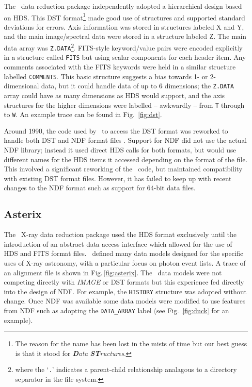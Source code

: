 \documentclass[final,authoryear,5p,times,twocolumn]{elsarticle}
\begin{document}
The \figaro\ data reduction package
\citep[][]{1988igbo.conf..448C,1993ASPC...52..219S}
independently adopted a hierarchical design based on HDS. This DST
format\footnote{The reason for the name has been lost in the mists of
  time but our best guess is that it stood for \emph{\textbf{D}ata
    \textbf{ST}ructures}.} made good use of structures and supported
standard deviations for errors. Axis information was stored in
structures labeled X and Y, and the main image/spectral data were
stored in a structure labeled Z. The main data array was
\texttt{Z.DATA}\footnote{where the `\texttt{.}' indicates a
  parent-child relationship analagous to a directory separator in the
  file system.}. FITS-style keyword/value pairs were encoded
explicitly in a structure called \texttt{FITS} but using scalar
components for each header item. Any comments associated with the FITS
keywords were held in a similar structure labelled
\texttt{COMMENTS}. This basic structure suggests a bias towards 1- or
2-dimensional data, but it could handle data of up to 6 dimensions;
the \texttt{Z.DATA} array could have as many dimensions as HDS would
support, and the axis structures for the higher dimensions were
labelled -- awkwardly -- from \texttt{T} through to \texttt{W}. An
example trace can be found in Fig.~\ref{fig:dst}.

Around 1990, the code used by \figaro\ to access the DST format was
reworked to handle both DST and NDF format files
\citep{1990STARB...6...18S}. Support for NDF did
not use the actual NDF library; instead it used direct HDS calls for
both formats, but would use different names for the HDS items it
accessed depending on the format of the file. This involved a
significant reworking of the \figaro\ code, but maintained compatibility
with existing DST format files. However, it has failed to keep up with
recent changes to the NDF format such as support for 64-bit data
files.

\subsection{Asterix}
\label{app:asterix}

The \asterix\ X-ray data reduction package
\citep{1987JBIS...40..185P,SUN98,1992STARB...9....3S} used the HDS
format exclusively until the introduction of an abstract data access
interface \citep{1995ASPC...77..199A} which allowed for the use of HDS
and FITS format files. \asterix\ defined many data models designed for
the specific uses of X-ray astronomy, with a particular focus on
photon event lists. A trace of an alignment file is shown in
Fig.\,\ref{fig:asterix}. The \asterix\ data models were not competing directly with \emph{IMAGE} or
DST formats but this experience fed directly into the design of NDF.
For example, the \texttt{HISTORY} structure was adopted without change. Once
NDF was available some data models were modified to use features from
NDF such as adopting the \texttt{DATA\_ARRAY} label (see
Fig.~\ref{fig:duck} for an example).
\end{document}
